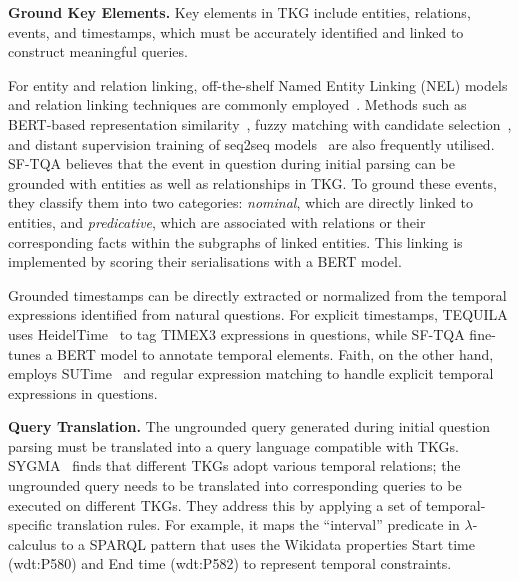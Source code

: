 {\textbf{Ground Key Elements.} 
Key elements in TKG include entities, relations, events, and timestamps, which must be accurately identified and linked to construct meaningful queries. 

For entity and relation linking, off-the-shelf Named Entity Linking (NEL) models and relation linking techniques are commonly employed~\cite{chenTemporalKnowledgeQuestion2023, neelamSYGMASystemGeneralizable2021, kannenBestBothWorlds2023}. Methods such as BERT-based representation similarity~\cite{longComplexQuestionAnswering2022}, fuzzy matching with candidate selection~\cite{chenSelfImprovementProgrammingTemporal2024}, and distant supervision training of seq2seq models~\cite{jia2024faithful} are also frequently utilised. SF-TQA believes that the event in question during initial parsing can be grounded with entities as well as relationships in TKG. To ground these events, they classify them into two categories: \textit{nominal}, which are directly linked to entities, and \textit{predicative}, which are associated with relations or their corresponding facts within the subgraphs of linked entities. This linking is implemented by scoring their serialisations with a BERT model.

Grounded timestamps can be directly extracted or normalized from the temporal expressions identified from natural questions.
For explicit timestamps, TEQUILA uses HeidelTime~\cite{strotgenHeidelTimeHighQuality2010} to tag TIMEX3 expressions in questions, while SF-TQA fine-tunes a BERT model to annotate temporal elements. Faith, on the other hand, employs SUTime~\cite{changSUTIMELibraryRecognizing} and regular expression matching to handle explicit temporal expressions in questions.

\textbf{Query Translation.} 
The ungrounded query generated during initial question parsing must be translated into a query language compatible with TKGs. SYGMA~\cite{neelamSYGMASystemGeneralizable2021} finds that different TKGs adopt various temporal relations; the ungrounded query needs to be translated into corresponding queries to be executed on different TKGs.
They address this by applying a set of temporal-specific translation rules. For example, it maps the “interval” predicate in $\lambda$-calculus to a SPARQL pattern that uses the Wikidata properties Start time (wdt:P580) and End time (wdt:P582) to represent temporal constraints. 

}
